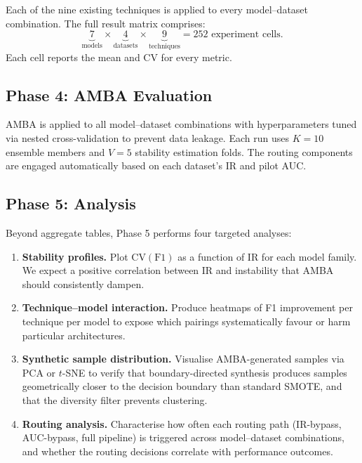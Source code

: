 \documentclass[11pt,a4paper]{article}
\newcommand{\CV}{\mathrm{CV}}
\begin{document}
Each of the nine existing techniques is applied to every model--dataset combination. The
full result matrix comprises:
\[
  \underbrace{7}_{\text{models}} \times \underbrace{4}_{\text{datasets}} \times \underbrace{9}_{\text{techniques}} = 252 \text{ experiment cells}.
\]
Each cell reports the mean and CV for every metric.

\subsection{Phase 4: AMBA Evaluation}

AMBA is applied to all model--dataset combinations with hyperparameters tuned via nested
cross-validation to prevent data leakage. Each run uses $K = 10$ ensemble members and
$V = 5$ stability estimation folds. The routing components are engaged automatically based
on each dataset's IR and pilot AUC.

\subsection{Phase 5: Analysis}

Beyond aggregate tables, Phase 5 performs four targeted analyses:

\begin{enumerate}[itemsep=4pt]
  \item \textbf{Stability profiles.} Plot $\CV(\text{F1})$ as a function of IR for each model
        family. We expect a positive correlation between IR and instability that AMBA should
        consistently dampen.
  \item \textbf{Technique--model interaction.} Produce heatmaps of F1 improvement per
        technique per model to expose which pairings systematically favour or harm particular
        architectures.
  \item \textbf{Synthetic sample distribution.} Visualise AMBA-generated samples via PCA
        or $t$-SNE to verify that boundary-directed synthesis produces samples geometrically
        closer to the decision boundary than standard SMOTE, and that the diversity filter
        prevents clustering.
  \item \textbf{Routing analysis.} Characterise how often each routing path (IR-bypass,
        AUC-bypass, full pipeline) is triggered across model--dataset combinations, and
        whether the routing decisions correlate with performance outcomes.
\end{enumerate}

\end{document}
